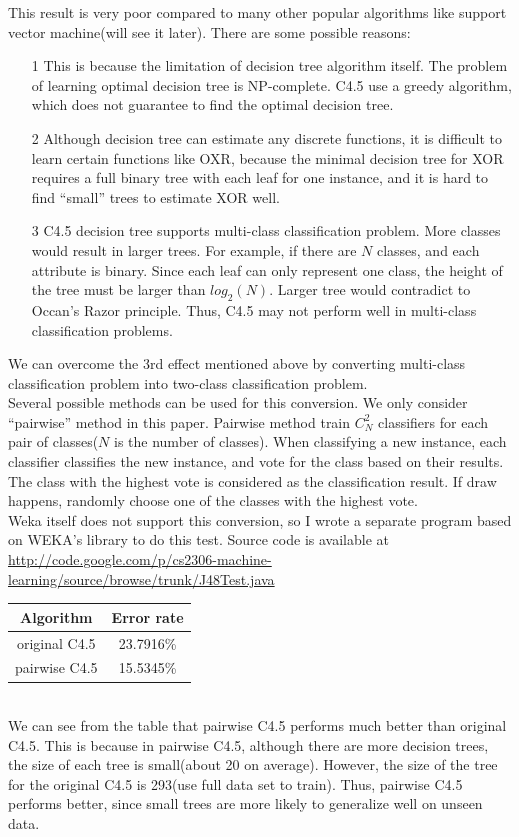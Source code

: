 \documentclass[a4paper,11pt]{article}
\begin{document}
This result is very poor compared to many other popular algorithms like support vector machine(will see it later). There are some possible reasons:\\
\begin{enumerate}
\item[1] This is because the limitation of decision tree algorithm itself. The problem of learning optimal decision tree is NP-complete\cite{DT_NPC}. C4.5 use a greedy algorithm, which does not guarantee to find the optimal decision tree.\\
\item[2] Although decision tree can estimate any discrete functions, it is difficult to learn certain functions like OXR, because the minimal decision tree for XOR requires a full binary tree with each leaf for one instance, and it is hard to find ``small'' trees to estimate XOR well.
\item[3] C4.5 decision tree supports multi-class classification problem. More classes would result in larger trees. For example, if there are $N$ classes, and each attribute is binary. Since each leaf can only represent one class, the height of the tree must be larger than $log_2(N)$. Larger tree would contradict to Occan's Razor principle. Thus, C4.5 may not perform well in multi-class classification problems.
\end{enumerate}
We can overcome the 3rd effect mentioned above by converting multi-class classification problem into two-class classification problem.\\
Several possible methods can be used for this conversion. We only consider ``pairwise'' method in this paper. Pairwise method train $C_N^2$ classifiers for each pair of classes($N$ is the number of classes). When classifying a new instance, each classifier classifies the new instance, and vote for the class based on their results. The class with the highest vote is considered as the classification result. If draw happens, randomly choose one of the classes with the highest vote.\\
Weka itself does not support this conversion, so I wrote a separate program based on WEKA's library to do this test.
Source code is available at \url{http://code.google.com/p/cs2306-machine-learning/source/browse/trunk/J48Test.java}\\
\vspace{0.5cm}
\begin{tabular}{c c}
Algorithm	& Error rate\\
\hline \hline
original C4.5	& 23.7916\%\\
pairwise C4.5	& 15.5345\%\\
\end{tabular}
\vspace{0.5cm}\\
We can see from the table that pairwise C4.5 performs much better than original C4.5. This is because in pairwise C4.5, although there are more decision trees, the size of each tree is small(about 20 on average). However, the size of the tree for the original C4.5 is 293(use full data set to train). Thus, pairwise C4.5 performs better, since small trees are more likely to generalize well on unseen data.
\end{document}
